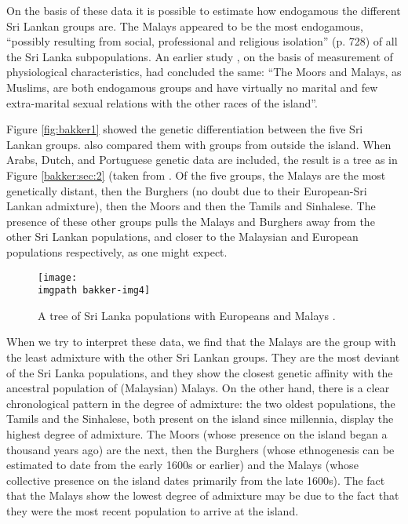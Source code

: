 On the basis of these data it is possible to estimate how endogamous the different Sri Lankan groups are. The Malays appeared to be the most endogamous, ``possibly resulting from social, professional and religious isolation'' (p. 728) of all the Sri Lanka subpopulations. An earlier study \citep[43]{Stoudt1961}, on the basis of measurement of physiological characteristics, had concluded the same: ``The Moors and Malays, as Muslims, are both endogamous groups and have virtually no marital and few extra-marital sexual relations with the other races of the island''. 

Figure \ref{fig:bakker1} showed the genetic differentiation between the five Sri Lankan groups.  \citet{PapihaEtAl1996} also compared them with groups from outside the island. When Arabs, Dutch, and Portuguese genetic data are included, the result is a tree as in Figure \ref{bakker:sec:2} (taken from \citet[734, Fig. 4]{PapihaEtAl1996}. Of the five groups, the Malays are the most genetically distant, then the Burghers (no doubt due to their European-Sri Lankan admixture), then the Moors and then the Tamils and Sinhalese. The presence of these other groups pulls the Malays and Burghers away from the other Sri Lankan populations, and closer to the Malaysian and European populations respectively, as one might expect.

\begin{figure}%
\texttt{[image: \\imgpath bakker-img4]}
\caption[A tree of Sri Lanka populations with Europeans and Malays]{A tree of Sri Lanka populations with Europeans and Malays
\citep[from][734]{PapihaEtAl1996}.}
\label{fig:bakker2}
\end{figure}

When we try to interpret these data, we find that the Malays are the group with the least admixture with the other Sri Lankan groups. They are the most deviant of the Sri Lanka populations, and they show the closest genetic affinity with the ancestral population of (Malaysian) Malays. On the other hand, there is a clear chronological pattern in the degree of admixture: the two oldest populations, the Tamils and the Sinhalese, both present on the island since millennia, display the highest degree of admixture. The Moors (whose presence on the island began a thousand years ago) are the next, then the Burghers (whose ethnogenesis can be estimated to date from the early 1600s or earlier) and the Malays (whose collective presence on the island dates primarily from the late 1600s). The fact that the Malays show the lowest degree of admixture may be due to the fact that they were the most recent population to arrive at the island. 

